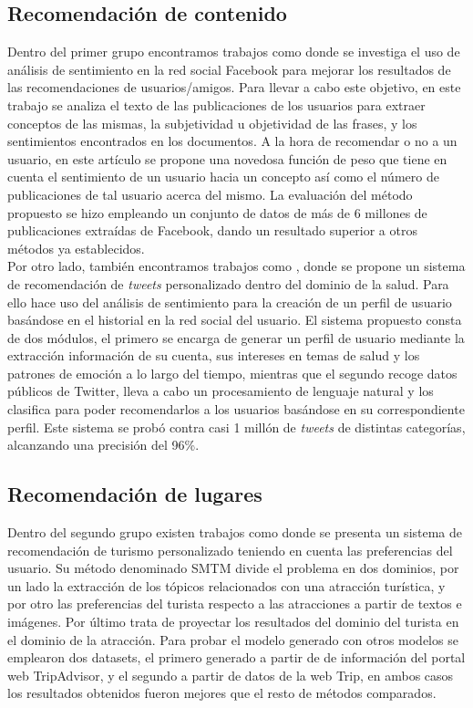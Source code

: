 \subsection{Recomendación de contenido}

Dentro del primer grupo encontramos trabajos como \cite{sent_analysis_facebook_user_recom} donde se investiga el uso de análisis de sentimiento en la red social Facebook para mejorar los resultados de las recomendaciones de usuarios/amigos. Para llevar a cabo este objetivo, en este trabajo se analiza el texto de las publicaciones de los usuarios para extraer conceptos de las mismas, la subjetividad u objetividad de las frases, y los sentimientos encontrados en los documentos. A la hora de recomendar o no a un usuario, en este artículo se propone una novedosa función de peso que tiene en cuenta el sentimiento de un usuario hacia un concepto así como el número de publicaciones de tal usuario acerca del mismo. La evaluación del método propuesto se hizo empleando un conjunto de datos de más de 6 millones de publicaciones extraídas de Facebook, dando un resultado superior a otros métodos ya establecidos.\\

Por otro lado, también encontramos trabajos como \cite{pers_tweet_recomendation}, donde se propone un sistema de recomendación de \textit{tweets} personalizado dentro del dominio de la salud. Para ello hace uso del análisis de sentimiento para la creación de un perfil de usuario basándose en el historial en la red social del usuario. El sistema propuesto consta de dos módulos, el primero se encarga de generar un perfil de usuario mediante la extracción información de su cuenta, sus intereses en temas de salud y los patrones de emoción a lo largo del tiempo, mientras que el segundo recoge datos públicos de Twitter, lleva a cabo un procesamiento de lenguaje natural y los clasifica para poder recomendarlos a los usuarios basándose en su correspondiente perfil. Este sistema se probó contra casi 1 millón de \textit{tweets} de distintas categorías, alcanzando una precisión del 96\%.\\

\subsection{Recomendación de lugares}

Dentro del segundo grupo existen trabajos como \cite{8796367} donde se presenta un sistema de recomendación de turismo personalizado teniendo en cuenta las preferencias del usuario. Su método denominado SMTM divide el problema en dos dominios, por un lado la extracción de los tópicos relacionados con una atracción turística, y por otro las preferencias del turista respecto a las atracciones a partir de textos e imágenes. Por último trata de proyectar los resultados del dominio del turista en el dominio de la atracción. Para probar el modelo generado con otros modelos se emplearon dos datasets, el primero generado a partir de de información del portal web TripAdvisor, y el segundo a partir de datos de la web Trip, en ambos casos los resultados obtenidos fueron mejores que el resto de métodos comparados.\\

